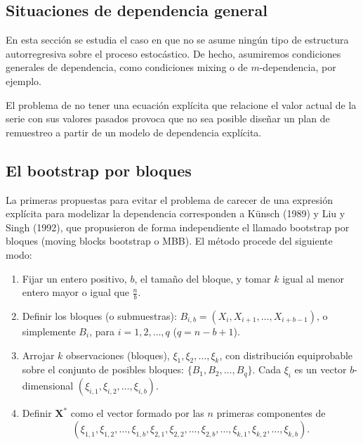 \documentclass[
]{book}
\renewcommand{\mathbf}[1]{\symbf{#1}}
\theoremstyle{break}
\theoremstyle{nonumberplain}
\begin{document}
\subsection{Situaciones de dependencia general}\label{situaciones-de-dependencia-general-1}

En esta sección se estudia el caso en que no se asume ningún tipo de
estructura autorregresiva sobre el proceso estocástico. De hecho,
asumiremos condiciones generales de dependencia, como condiciones mixing
o de \(m\)-dependencia, por ejemplo.

El problema de no tener una ecuación explícita que relacione el valor
actual de la serie con sus valores pasados provoca que no sea posible
diseñar un plan de remuestreo a partir de un modelo de dependencia
explícita.

\subsection{El bootstrap por bloques}\label{el-bootstrap-por-bloques}

La primeras propuestas para evitar el problema de carecer de una
expresión explícita para modelizar la dependencia corresponden a Künsch
(1989) y Liu y Singh (1992), que propusieron de forma independiente el
llamado bootstrap por bloques (moving blocks bootstrap o MBB). El método
procede del siguiente modo:

\begin{enumerate}
\def\labelenumi{\arabic{enumi}.}
\item
  Fijar un entero positivo, \(b\), el tamaño del bloque, y tomar \(k\)
  igual al menor entero mayor o igual que \(\frac{n}{b}\).
\item
  Definir los bloques (o submuestras): \(B_{i,b}=(X_i,X_{i+1},\ldots
  ,X_{i+b-1})\), o simplemente \(B_i\), para \(i=1,2,\ldots ,q\)
  (\(q=n-b+1\))\(.\)
\item
  Arrojar \(k\) observaciones (bloques), \(\xi _1,\xi _2,\ldots ,\xi
  _{k}\), con distribución equiprobable sobre el conjunto de posibles
  bloques: \(\{B_1,B_2,\ldots ,B_{q}\}\). Cada \(\xi _i\) es un
  vector \(b\)-dimensional \((\xi _{i,1},\xi _{i,2},\ldots ,\xi _{i,b})\).
\item
  Definir \(\mathbf{X}^{\ast}\) como el vector formado por las \(n\)
  primeras componentes de
  \[(\xi _{1,1},\xi _{1,2},\ldots ,\xi _{1,b},\xi _{2,1},\xi _{2,2},\ldots ,\xi
  _{2,b},\ldots ,\xi _{k,1},\xi _{k,2},\ldots ,\xi _{k,b}).\]
\end{enumerate}
\end{document}
